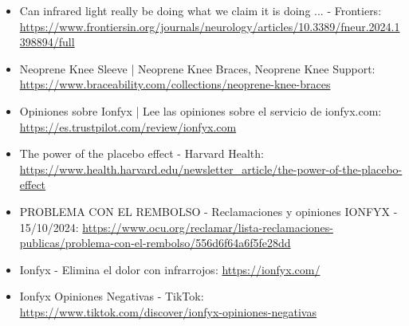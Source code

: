 \documentclass{article}
\begin{document}
\begin{itemize}
    \item Can infrared light really be doing what we claim it is doing ... - Frontiers: \url{https://www.frontiersin.org/journals/neurology/articles/10.3389/fneur.2024.1398894/full}
    \item Neoprene Knee Sleeve | Neoprene Knee Braces, Neoprene Knee Support: \url{https://www.braceability.com/collections/neoprene-knee-braces}
    \item Opiniones sobre Ionfyx | Lee las opiniones sobre el servicio de ionfyx.com: \url{https://es.trustpilot.com/review/ionfyx.com}
    \item The power of the placebo effect - Harvard Health: \url{https://www.health.harvard.edu/newsletter_article/the-power-of-the-placebo-effect}
    \item PROBLEMA CON EL REMBOLSO - Reclamaciones y opiniones IONFYX - 15/10/2024: \url{https://www.ocu.org/reclamar/lista-reclamaciones-publicas/problema-con-el-rembolso/556d6f64a6f5fe28dd}
    \item Ionfyx - Elimina el dolor con infrarrojos: \url{https://ionfyx.com/}
    \item Ionfyx Opiniones Negativas - TikTok: \url{https://www.tiktok.com/discover/ionfyx-opiniones-negativas}
\end{itemize}
\end{document}
